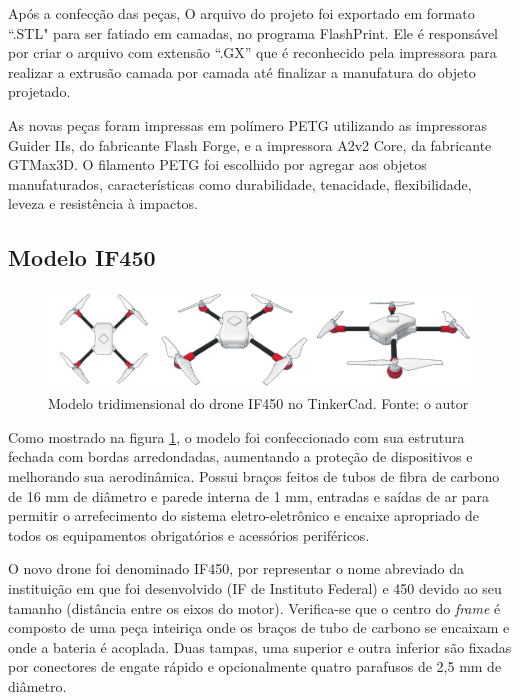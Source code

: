 \documentclass[conference]{IEEEtran}
\begin{document}
Após a confecção das peças, O arquivo do projeto foi exportado em formato “.STL" para ser fatiado em camadas, no programa FlashPrint. Ele é responsável por criar o arquivo com extensão “.GX” que é reconhecido pela impressora para realizar a extrusão camada por camada até finalizar a manufatura do objeto projetado.

As novas peças foram impressas em polímero PETG utilizando as impressoras Guider IIs, do fabricante Flash Forge, e a impressora A2v2 Core, da fabricante GTMax3D. O filamento PETG foi escolhido por agregar aos objetos manufaturados, características como durabilidade, tenacidade, flexibilidade, leveza e resistência à impactos.

\subsection{Modelo IF450}

\begin{figure}[!htb]
    \centering
    \includegraphics[scale=0.14]{img/IF450.png} 
    \caption{Modelo tridimensional do drone IF450 no TinkerCad. Fonte: o autor}
    \label{fig:IF450}
\end{figure}

Como mostrado na figura \ref{fig:IF450}, o modelo foi confeccionado com sua estrutura fechada com bordas arredondadas, aumentando a proteção de dispositivos e melhorando sua aerodinâmica. Possui braços feitos de tubos de fibra de carbono de 16 mm de diâmetro e parede interna de 1 mm, entradas e saídas de ar para permitir o arrefecimento do sistema eletro-eletrônico e encaixe apropriado de todos os equipamentos obrigatórios e acessórios periféricos. 

O novo drone foi denominado IF450, por representar o nome abreviado da instituição em que foi desenvolvido (IF de Instituto Federal) e 450 devido ao seu tamanho (distância entre os eixos do motor). Verifica-se que o centro do \textit{frame} é composto de uma peça inteiriça onde os braços de tubo de carbono se encaixam e onde a bateria é acoplada. Duas tampas, uma superior e outra inferior são fixadas por conectores de engate rápido e opcionalmente quatro parafusos de 2,5 mm de diâmetro. 
\end{document}
